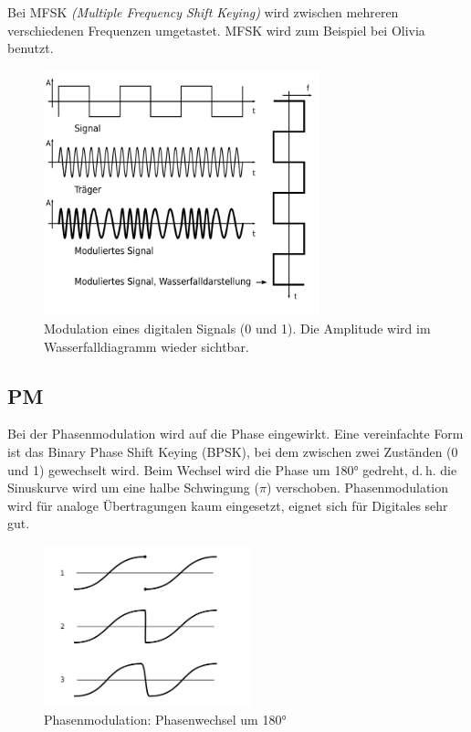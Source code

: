 Bei MFSK \textit{(Multiple Frequency Shift Keying)} wird zwischen mehreren verschiedenen Frequenzen umgetastet. MFSK wird zum Beispiel bei Olivia benutzt.

\begin{figure}[h!]
 \centering
 \includegraphics[width=8cm]{./png/Amfu-FSK.png}
 \caption{Modulation eines digitalen Signals (0 und 1). Die Amplitude wird im Wasserfalldiagramm wieder sichtbar.}
 \label{fig:fskMod}
\end{figure}


\subsection{PM}
Bei der Phasenmodulation wird auf die Phase eingewirkt. Eine vereinfachte Form ist das Binary Phase Shift Keying (BPSK), bei dem zwischen zwei Zuständen (0 und 1) gewechselt wird. Beim Wechsel wird die Phase um 180° gedreht, d. h. die Sinuskurve wird um eine halbe Schwingung ($\pi$) verschoben. Phasenmodulation wird für analoge Übertragungen kaum eingesetzt, eignet sich für Digitales sehr gut.

\begin{figure}[h!]
 \centering
 \includegraphics[width=6cm]{./png/Amfu-PM.png}
 \caption{Phasenmodulation: Phasenwechsel um 180°}
 \label{fig:pm}
\end{figure}

